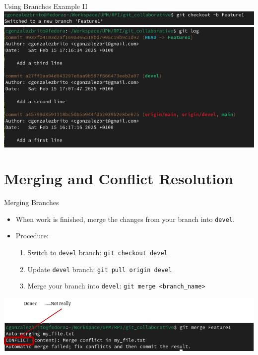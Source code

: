 \begin{frame}{Using Branches Example II}
  \centering
  \includegraphics[width=0.75\linewidth]{trainingmaterials/git-II/git_new_branch_feature1.png}
  \includegraphics[width=0.75\linewidth]{trainingmaterials/git-II/git_log_feature.png}
\end{frame}

\section{Merging and Conflict Resolution}

\begin{frame}{Merging Branches}
  \begin{itemize}
    \item When work is finished, merge the changes from your branch into \texttt{devel}.
    \item Procedure: 
        \begin{enumerate}
            \item Switch to \texttt{devel} branch: \texttt{git checkout devel}
            \item Update \texttt{devel} branch: \texttt{git pull origin devel}
            \item Merge your branch into \texttt{devel}: \texttt{git merge <branch\_name>}
      \end{enumerate}
  \end{itemize}
  
  \centering
  \includegraphics[width=0.75\linewidth]{trainingmaterials/git-II/git_merge_conflict.png}
\end{frame}

